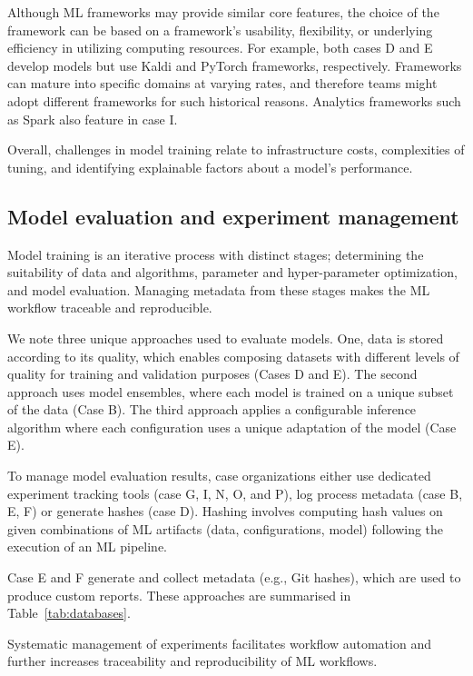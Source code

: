 Although ML frameworks may provide similar core features, the choice of the framework can be based on a framework's usability, flexibility, or underlying efficiency in utilizing computing resources. For example, both cases D and E develop \DIFdelbegin {}\DIFdelend \DIFaddbegin {}\DIFaddend models but use Kaldi and PyTorch frameworks, respectively. 
Frameworks can mature into specific domains at varying rates, and therefore teams might adopt different frameworks for such historical reasons. Analytics frameworks such as Spark also feature in case I. 

Overall, challenges in model training relate to infrastructure costs, complexities of tuning, and identifying explainable factors about a model's performance.



\subsection{Model evaluation and experiment management}
Model training is an iterative process with distinct stages; determining the suitability of data and algorithms, parameter and hyper-parameter optimization, and model evaluation. Managing metadata from these stages makes the ML workflow traceable and reproducible.

We note three unique approaches used to evaluate models. One, data is stored according to its quality, which enables composing datasets with different levels of quality for training and validation purposes (Cases D and E). The second approach uses model ensembles, where each model is trained on a unique subset of the data (Case B). The third approach applies a configurable inference algorithm where each configuration uses a unique adaptation of the model (Case E). 

To manage model evaluation results, case organizations either use dedicated experiment tracking tools (case G, I, N, O, and P), log process metadata (case B, E, F) or generate hashes (case D). Hashing involves computing hash values on given combinations of ML artifacts (data, configurations, model) following the execution of an ML pipeline. \DIFdelbegin %

\DIFdelend Case E and F generate and collect metadata (e.g., Git hashes), which are used to produce custom reports. These approaches are summarised in Table~\ref{tab:databases}. 
\DIFdelbegin %

\DIFdelend Systematic management of experiments facilitates workflow automation and further increases \DIFdelbegin {}\DIFdelend traceability and reproducibility of ML workflows.

